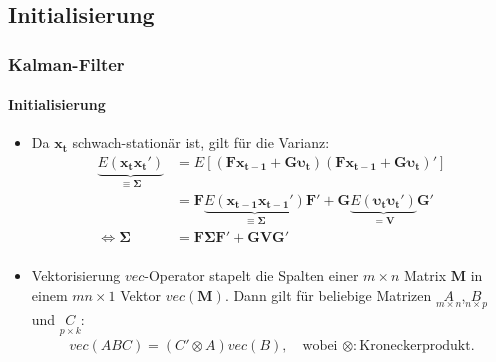 \documentclass{beamer} %
\begin{document}
\subsection{Initialisierung}
\begin{frame}\frametitle{Kalman-Filter}\framesubtitle{Initialisierung}
  \begin{itemize}
    \item Da $\mathbf{x_t}$ schwach-station\"{a}r
ist, gilt f\"{u}r die Varianz:
\begin{align*}
    \underbrace{E(\mathbf{x_t} \mathbf{x_t}')}_{\equiv \boldsymbol{\Sigma}}&=E\left[(\mathbf{F} \mathbf{x_{t-1}} + \mathbf{G} \boldsymbol{\upsilon_t})(\mathbf{F} \mathbf{x_{t-1}} + \mathbf{G} \boldsymbol{\upsilon_t})'\right] \\
    &= \mathbf{F} \underbrace{E(\mathbf{x_{t-1}}\mathbf{x_{t-1}}')}_{\equiv \boldsymbol{\Sigma}}\mathbf{F}' + \mathbf{G} \underbrace{E(\boldsymbol{\upsilon_t} \boldsymbol{\upsilon_t}')}_{=\mathbf{V}} \mathbf{G}'\\
\Leftrightarrow \boldsymbol{\Sigma} &= \mathbf{F} \boldsymbol{\Sigma} \mathbf{F'} + \mathbf{G} \mathbf{V} \mathbf{G}'\\
\end{align*}
\item \begin{block}{Vektorisierung}
    $vec$-Operator stapelt die Spalten einer $m\times n$ Matrix $\mathbf{M}$ in einem $mn\times 1$ Vektor $vec(\mathbf{M})$. Dann gilt f\"{u}r beliebige Matrizen $\underset{m\times n}{A}$,$\underset{n\times p}{B}$ und $\underset{p \times k}{C}$:
    \begin{align*}
        vec(ABC) = (C' \otimes A)vec(B), \quad \text{wobei } \otimes: \text{Kroneckerprodukt.}
    \end{align*}
\end{block}
  \end{itemize}
\end{frame}
\end{document}
